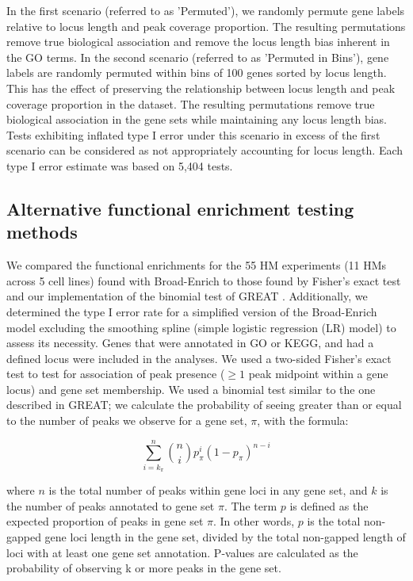 In the first scenario (referred to as 'Permuted'), we randomly permute gene labels relative to locus length and peak coverage proportion. The resulting permutations remove true biological association and remove the locus length bias inherent in the GO terms. In the second scenario (referred to as 'Permuted in Bins'), gene labels are randomly permuted within bins of 100 genes sorted by locus length. This has the effect of preserving the relationship between locus length and peak coverage proportion in the dataset. The resulting permutations remove true biological association in the gene sets while maintaining any locus length bias. Tests exhibiting inflated type I error under this scenario in excess of the first scenario can be considered as not appropriately accounting for locus length. Each type I error estimate was based on 5,404 tests.

\subsection{Alternative functional enrichment testing methods}
\label{broadenrich_methods_alternatives}

We compared the functional enrichments for the 55 HM experiments (11 HMs across 5 cell lines) found with Broad-Enrich to those found by Fisher's exact test and our implementation of the binomial test of GREAT \cite{McLean:2010iq}. Additionally, we determined the type I error rate for a simplified version of the Broad-Enrich model excluding the smoothing spline (simple logistic regression (LR) model) to assess its necessity. Genes that were annotated in GO or KEGG, and had a defined locus were included in the analyses. We used a two-sided Fisher's exact test to test for association of peak presence ($\geq 1$ peak midpoint within a gene locus) and gene set membership. We used a binomial test similar to the one described in GREAT; we calculate the probability of seeing greater than or equal to the number of peaks we observe for a gene set, $\pi$, with the formula:

\begin{equation} \label{broadenrich_equation_great}
	\sum_{i = k_{\pi}}^{n} {n \choose i} p_{\pi}^i (1 - p_{\pi})^{n - i}
\end{equation}

where $n$ is the total number of peaks within gene loci in any gene set, and $k$ is the number of peaks annotated to gene set $\pi$. The term $p$ is defined as the expected proportion of peaks in gene set $\pi$. In other words, $p$ is the total non-gapped gene loci length in the gene set, divided by the total non-gapped length of loci with at least one gene set annotation. P-values are calculated as the probability of observing k or more peaks in the gene set.


